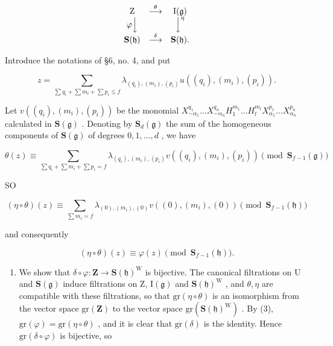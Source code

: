 \[
\begin{array}{c c c} \mathrm{Z} & \stackrel {{\theta}} {{\longrightarrow}} & \mathrm{I} (\mathfrak {g}) \\ \varphi \Big \downarrow & & \Big \downarrow^ {\eta} \\ \mathbf {S} (\mathfrak {h}) & \stackrel {{\delta}} {{\longrightarrow}} & \mathbf {S} (\mathfrak {h}). \end{array}
\]

Introduce the notations of §6, no. 4, and put

\[
z = \sum_ {\sum q _ {i} + \sum m _ {i} + \sum p _ {i} \leq f} \lambda_ {(q _ {i}), (m _ {i}), (p _ {i})} u ((q _ {i}), (m _ {i}), (p _ {i})).
\]

Let \(v((q_i),(m_i),(p_i))\) be the monomial \(X_{-\alpha_1}^{q_1}\ldots X_{-\alpha_n}^{q_n}H_1^{m_1}\ldots H_l^{m_l}X_{\alpha_1}^{p_1}\ldots X_{\alpha_n}^{p_n}\) calculated in \(\mathbf{S}(\mathfrak{g})\) . Denoting by \(\mathbf{S}_d(\mathfrak{g})\) the sum of the homogeneous components of \(\mathbf{S}(\mathfrak{g})\) of degrees \(0,1,\ldots,d\) , we have

\[
\theta (z) \equiv \sum_ {\sum q _ {i} + \sum m _ {i} + \sum p _ {i} = f} \lambda_ {(q _ {i}), (m _ {i}), (p _ {i})} v ((q _ {i}), (m _ {i}), (p _ {i})) \pmod {\mathbf {S} _ {f - 1} (\mathfrak {g})}
\]

SO

\[
(\eta \circ \theta) (z) \equiv \sum_ {\sum m _ {i} = f} \lambda_ {(0), (m _ {i}), (0)} v ((0), (m _ {i}), (0)) \pmod {\mathbf {S} _ {f - 1} (\mathfrak {h})}
\]

and consequently

\[
(\eta \circ \theta) (z) \equiv \varphi (z) \pmod {\mathbf {S} _ {f - 1} (\mathfrak {h})}.\tag{3}
\]

\begin{enumerate}
\def\labelenumi{\alph{enumi})}
\setcounter{enumi}{2}
\tightlist
\item
  We show that \(\delta \circ \varphi : \mathbf{Z} \to \mathbf{S}(\mathfrak{h})^{\mathrm{W}}\) is bijective. The canonical filtrations on U and \(\mathbf{S}(\mathfrak{g})\) induce filtrations on Z, \(\mathrm{I}(\mathfrak{g})\) and \(\mathbf{S}(\mathfrak{h})^{\mathrm{W}}\) , and \(\theta, \eta\) are compatible with these filtrations, so that \(\mathrm{gr}(\eta\circ\theta)\) is an isomorphism from the vector space \(\mathrm{gr}(\mathbf{Z})\) to the vector space \(\mathrm{gr}(\mathbf{S}(\mathfrak{h})^{\mathrm{W}})\) . By (3), \(\mathrm{gr}(\varphi)=\mathrm{gr}(\eta\circ\theta)\) , and it is clear that \(\mathrm{gr}(\delta)\) is the identity. Hence \(\mathrm{gr}(\delta\circ\varphi)\) is bijective, so
\end{enumerate}

